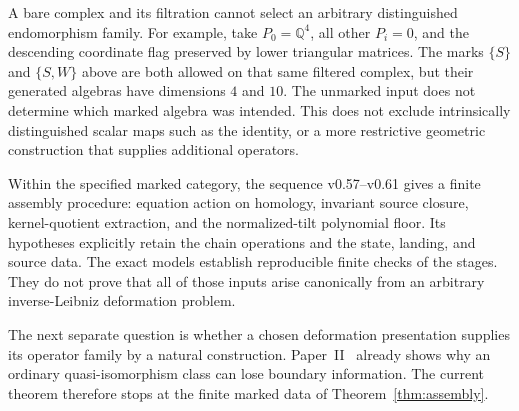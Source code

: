 \documentclass[11pt]{amsart}
\theoremstyle{definition}
\newcommand{\Q}{\mathbb Q}
\begin{document}
A bare complex and its filtration cannot select an arbitrary distinguished
endomorphism family. For example, take \(P_0=\Q^4\), all other \(P_i=0\), and the
descending coordinate flag preserved by lower triangular matrices. The marks
\(\{S\}\) and \(\{S,W\}\) above are both allowed on that same filtered complex,
but their generated algebras have dimensions \(4\) and \(10\). The unmarked input
does not determine which marked algebra was intended. This does not exclude
intrinsically distinguished scalar maps such as the identity, or a more restrictive
geometric construction that supplies additional operators.

Within the specified marked category, the sequence v0.57--v0.61 gives a finite
assembly procedure: equation action on homology, invariant source closure,
kernel-quotient extraction, and the normalized-tilt polynomial floor.
Its hypotheses explicitly retain the chain operations and the state, landing, and
source data. The exact models establish reproducible finite checks of the stages.
They do not prove that all of those inputs arise canonically from an arbitrary
inverse-Leibniz deformation problem.



The next separate question is whether a chosen deformation presentation supplies
its operator family by a natural construction. Paper~II~\cite{PaperII} already
shows why an ordinary quasi-isomorphism class can lose boundary information.
The current theorem therefore stops at the finite marked data of
Theorem~\ref{thm:assembly}.
\end{document}
